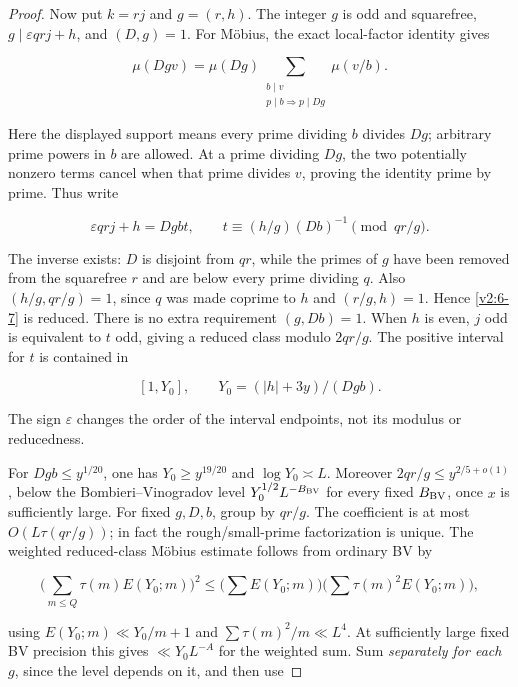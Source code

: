 \documentclass[11pt]{article}
\theoremstyle{definition}
\theoremstyle{remark}
\numberwithin{equation}{section}
\begin{document}
\begin{proof}
Now put $k=rj$ and $g=(r,h)$. The integer $g$ is odd and squarefree, $g\mid\varepsilon qrj+h$, and $(D,g)=1$. For M\"obius, the exact local-factor identity gives


\begin{equation}\label{v2:6-6}
\mu(Dg v)=\mu(Dg)\sum_{\substack{b\mid v\\p\mid b\Rightarrow p\mid Dg}}\mu(v/b).
\end{equation}


Here the displayed support means every prime dividing $b$ divides $Dg$; arbitrary prime powers in $b$ are allowed. At a prime dividing $Dg$, the two potentially nonzero terms cancel when that prime divides $v$, proving the identity prime by prime. Thus write


\begin{equation}\label{v2:6-7}
\varepsilon qrj+h=Dgbt,\qquad
t\equiv(h/g)(Db)^{-1}\pmod{qr/g}.
\end{equation}


The inverse exists: $D$ is disjoint from $qr$, while the primes of $g$ have been removed from the squarefree $r$ and are below every prime dividing $q$. Also $(h/g,qr/g)=1$, since $q$ was made coprime to $h$ and $(r/g,h)=1$. Hence \eqref{v2:6-7} is reduced. There is no extra requirement $(g,Db)=1$. When $h$ is even, $j$ odd is equivalent to $t$ odd, giving a reduced class modulo $2qr/g$. The positive interval for $t$ is contained in


\begin{equation}\label{v2:6-8}
[1,Y_0],\qquad Y_0=(|h|+3y)/(Dgb).
\end{equation}


The sign $\varepsilon$ changes the order of the interval endpoints, not its modulus or reducedness.

For $Dgb\le y^{1/20}$, one has $Y_0\ge y^{19/20}$ and $\log Y_0\asymp L$. Moreover $2qr/g\le y^{2/5+o(1)}$, below the Bombieri–Vinogradov level $Y_0^{1/2}L^{-B_{\rm BV}}$ for every fixed $B_{\rm BV}$, once $x$ is sufficiently large. For fixed $g,D,b$, group by $qr/g$. The coefficient is at most $O(L\tau(qr/g))$; in fact the rough/small-prime factorization is unique. The weighted reduced-class M\"obius estimate follows from ordinary BV by


\begin{equation}
\Big(\sum_{m\le Q}\tau(m)E(Y_0;m)\Big)^2
\le\Big(\sum E(Y_0;m)\Big)\Big(\sum\tau(m)^2E(Y_0;m)\Big),
\end{equation}


using $E(Y_0;m)\ll Y_0/m+1$ and $\sum\tau(m)^2/m\ll L^4$. At sufficiently large fixed BV precision this gives $\ll Y_0L^{-A}$ for the weighted sum. Sum \emph{separately for each $g$}, since the level depends on it, and then use



\end{proof}
\end{document}
